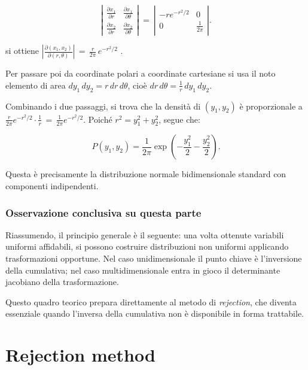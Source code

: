 \[\left|
\begin{matrix}
	\displaystyle\frac{\partial x_1}{\partial r} & \displaystyle\frac{\partial x_1}{\partial \theta}\\[4pt]
	\displaystyle\frac{\partial x_2}{\partial r} & \displaystyle\frac{\partial x_2}{\partial \theta}
\end{matrix}
\right|\ =\ 
\left|
\begin{matrix}
	-r e^{-r^2/2} & 0\\[4pt]
	0 & \frac{1}{2\pi}
\end{matrix}
\right|.\]

si ottiene $\displaystyle\left|\frac{\partial(x_1,x_2)}{\partial(r,\theta)}\right|\,=\,\displaystyle\frac{r}{2\pi}\, e^{-r^2/2}$ .


Per passare poi da coordinate polari a coordinate cartesiane si usa il noto elemento di area $dy_1\,dy_2 = r\,dr\,d\theta$, cioè $dr\,d\theta = \displaystyle\frac{1}{r}\,dy_1\,dy_2$.

Combinando i due passaggi, si trova che la densità di $(y_1,y_2)$ è proporzionale a $\displaystyle\frac{r}{2\pi}e^{-r^2/2}\cdot \frac{1}{r}\, =\,\displaystyle\frac{1}{2\pi}e^{-r^2/2}$.
Poiché $r^2 = y_1^2 + y_2^2$, segue che:

\[
P(y_1,y_2)=\frac{1}{2\pi}\exp\left(-\frac{y_1^2}{2}-\frac{y_2^2}{2}\right).
\]

Questa è precisamente la distribuzione normale bidimensionale standard 
con componenti indipendenti.

%
%
%
\subsubsection{Osservazione conclusiva su questa parte}

Riassumendo, il principio generale è il seguente: una volta ottenute variabili uniformi affidabili, si possono costruire distribuzioni non uniformi applicando trasformazioni opportune. Nel caso unidimensionale il punto chiave è l'inversione della cumulativa; nel caso multidimensionale entra in gioco il determinante jacobiano della trasformazione.

Questo quadro teorico prepara direttamente al metodo di \emph{rejection}, che diventa essenziale quando l'inversa della cumulativa non è disponibile in forma trattabile.

%
%
%
\vspace{0.5cm}
\section{Rejection method}

